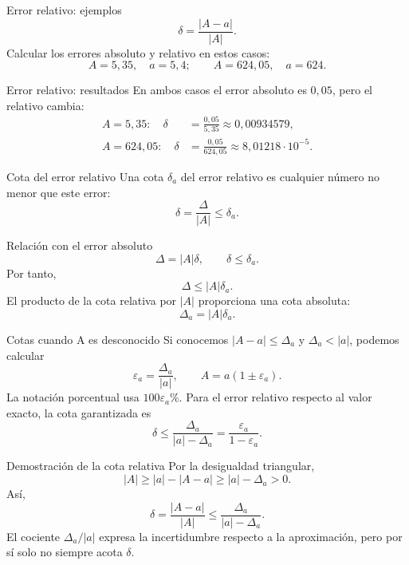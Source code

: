 \documentclass[main.tex]{subfiles}
\begin{document}
\begin{frame}{Error relativo: ejemplos}
\[\delta=\frac{|A-a|}{|A|}.\]Calcular los errores absoluto y relativo en estos casos:\[A=5{,}35,\quad a=5{,}4;\qquad A=624{,}05,\quad a=624.\]
\end{frame}

\begin{frame}{Error relativo: resultados}
En ambos casos el error absoluto es $0{,}05$, pero el relativo cambia:\begin{align*}A=5{,}35:\quad\delta&=\frac{0{,}05}{5{,}35}\approx0{,}00934579,\\A=624{,}05:\quad\delta&=\frac{0{,}05}{624{,}05}\approx8{,}01218\cdot10^{-5}.\end{align*}
\end{frame}

\begin{frame}{Cota del error relativo}
Una cota $\delta_a$ del error relativo es cualquier número no menor que este error:\[\delta=\frac\Delta{|A|}\le\delta_a.\]
\end{frame}

\begin{frame}{Relación con el error absoluto}
\[\Delta=|A|\delta,\qquad\delta\le\delta_a.\]Por tanto,\[\Delta\le |A|\delta_a.\]El producto de la cota relativa por $|A|$ proporciona una cota absoluta:\[\Delta_a=|A|\delta_a.\]
\end{frame}

\begin{frame}{Cotas cuando A es desconocido}
\small Si conocemos $|A-a|\le\Delta_a$ y $\Delta_a<|a|$, podemos calcular\[\varepsilon_a=\frac{\Delta_a}{|a|},\qquad A=a(1\pm\varepsilon_a).\]La notación porcentual usa $100\varepsilon_a\%$. Para el error relativo respecto al valor exacto, la cota garantizada es\[\boxed{\delta\le\frac{\Delta_a}{|a|-\Delta_a}=\frac{\varepsilon_a}{1-\varepsilon_a}.}\]
\end{frame}

\begin{frame}{Demostración de la cota relativa}
Por la desigualdad triangular,\[|A|\ge |a|-|A-a|\ge |a|-\Delta_a>0.\]Así,\[\delta=\frac{|A-a|}{|A|}\le\frac{\Delta_a}{|a|-\Delta_a}.\]El cociente $\Delta_a/|a|$ expresa la incertidumbre respecto a la aproximación, pero por sí solo no siempre acota $\delta$.
\end{frame}
\end{document}
